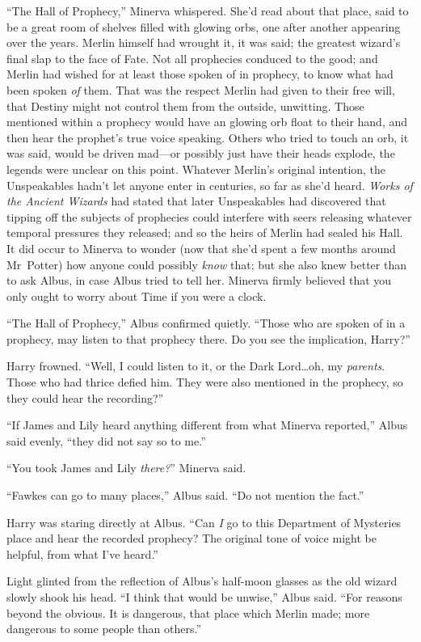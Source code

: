 “The Hall of Prophecy,” Minerva whispered. She’d read about that place, said to be a great room of shelves filled with glowing orbs, one after another appearing over the years. Merlin himself had wrought it, it was said; the greatest wizard’s final slap to the face of Fate. Not all prophecies conduced to the good; and Merlin had wished for at least those spoken of in prophecy, to know what had been spoken \emph{of} them. That was the respect Merlin had given to their free will, that Destiny might not control them from the outside, unwitting. Those mentioned within a prophecy would have an glowing orb float to their hand, and then hear the prophet’s true voice speaking. Others who tried to touch an orb, it was said, would be driven mad—or possibly just have their heads explode, the legends were unclear on this point. Whatever Merlin’s original intention, the Unspeakables hadn’t let anyone enter in centuries, so far as she’d heard. \emph{Works of the Ancient Wizards} had stated that later Unspeakables had discovered that tipping off the subjects of prophecies could interfere with seers releasing whatever temporal pressures they released; and so the heirs of Merlin had sealed his Hall. It did occur to Minerva to wonder (now that she’d spent a few months around Mr~Potter) how anyone could possibly \emph{know} that; but she also knew better than to ask Albus, in case Albus tried to tell her. Minerva firmly believed that you only ought to worry about Time if you were a clock.

“The Hall of Prophecy,” Albus confirmed quietly. “Those who are spoken of in a prophecy, may listen to that prophecy there. Do you see the implication, Harry?”

Harry frowned. “Well, I could listen to it, or the Dark Lord…oh, my \emph{parents}. Those who had thrice defied him. They were also mentioned in the prophecy, so they could hear the recording?”

“If James and Lily heard anything different from what Minerva reported,” Albus said evenly, “they did not say so to me.”

“You took James and Lily \emph{there?}” Minerva said.

“Fawkes can go to many places,” Albus said. “Do not mention the fact.”

Harry was staring directly at Albus. “Can \emph{I} go to this Department of Mysteries place and hear the recorded prophecy? The original tone of voice might be helpful, from what I’ve heard.”

Light glinted from the reflection of Albus’s half-moon glasses as the old wizard slowly shook his head. “I think that would be unwise,” Albus said. “For reasons beyond the obvious. It is dangerous, that place which Merlin made; more dangerous to some people than others.”

